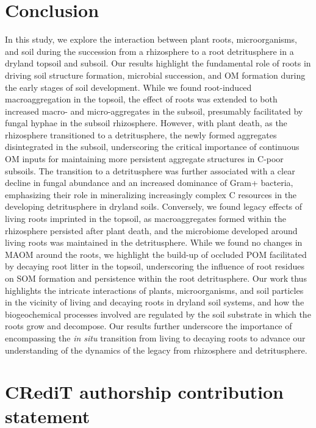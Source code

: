 \section{Conclusion}

In this study, we explore the interaction between plant roots, microorganisms, and soil during the succession from a rhizosphere to a root detritusphere in a dryland topsoil and subsoil. Our results highlight the fundamental role of roots in driving soil structure formation, microbial succession, and OM formation during the early stages of soil development. While we found root-induced macroaggregation in the topsoil, the effect of roots was extended to both increased macro- and micro-aggregates in the subsoil, presumably facilitated by fungal hyphae in the subsoil rhizosphere. However, with plant death, as the rhizosphere transitioned to a detritusphere, the newly formed aggregates disintegrated in the subsoil, underscoring the critical importance of continuous OM inputs for maintaining more persistent aggregate structures in C-poor subsoils. The transition to a detritusphere was further associated with a clear decline in fungal abundance and an increased dominance of Gram+ bacteria, emphasizing their role in mineralizing increasingly complex C resources in the developing detritusphere in dryland soils. Conversely, we found legacy effects of living roots imprinted in the topsoil, as macroaggregates formed within the rhizosphere persisted after plant death, and the microbiome developed around living roots was maintained in the detritusphere. While we found no changes in MAOM around the roots, we highlight the build-up of occluded POM facilitated by decaying root litter in the topsoil, underscoring the influence of root residues on SOM formation and persistence within the root detritusphere. Our work thus highlights the intricate interactions of plants, microorganisms, and soil particles in the vicinity of living and decaying roots in dryland soil systems, and how the biogeochemical processes involved are regulated by the soil substrate in which the roots grow and decompose. Our results further underscore the importance of encompassing the \textit{in situ} transition from living to decaying roots to advance our understanding of the dynamics of the legacy from rhizosphere and detritusphere.

\section*{CRediT authorship contribution statement}


